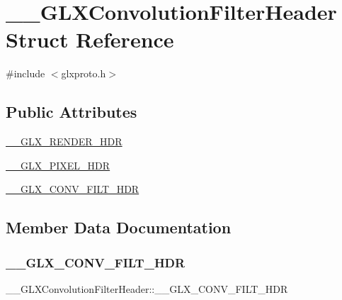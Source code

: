 \hypertarget{struct_____g_l_x_convolution_filter_header}{}\section{\+\_\+\+\_\+\+G\+L\+X\+Convolution\+Filter\+Header Struct Reference}
\label{struct_____g_l_x_convolution_filter_header}


{\ttfamily \#include $<$glxproto.\+h$>$}

\subsection*{Public Attributes}
\begin{DoxyCompactItemize}
\item 
\hyperlink{struct_____g_l_x_convolution_filter_header_afaa7f93d50e1289ca7720fdeb2a12aa8}{\+\_\+\+\_\+\+G\+L\+X\+\_\+\+R\+E\+N\+D\+E\+R\+\_\+\+H\+DR}
\item 
\hyperlink{struct_____g_l_x_convolution_filter_header_a9c9149168aaa3dfc3dbf8a5217cdf3ee}{\+\_\+\+\_\+\+G\+L\+X\+\_\+\+P\+I\+X\+E\+L\+\_\+\+H\+DR}
\item 
\hyperlink{struct_____g_l_x_convolution_filter_header_afc29b27ef6f497ab54dd1b1a785deac2}{\+\_\+\+\_\+\+G\+L\+X\+\_\+\+C\+O\+N\+V\+\_\+\+F\+I\+L\+T\+\_\+\+H\+DR}
\end{DoxyCompactItemize}


\subsection{Member Data Documentation}
\mbox{\label{struct_____g_l_x_convolution_filter_header_afc29b27ef6f497ab54dd1b1a785deac2}} 
\subsubsection{\texorpdfstring{\+\_\+\+\_\+\+G\+L\+X\+\_\+\+C\+O\+N\+V\+\_\+\+F\+I\+L\+T\+\_\+\+H\+DR}{\_\_GLX\_CONV\_FILT\_HDR}}
{\footnotesize\ttfamily \+\_\+\+\_\+\+G\+L\+X\+Convolution\+Filter\+Header\+::\+\_\+\+\_\+\+G\+L\+X\+\_\+\+C\+O\+N\+V\+\_\+\+F\+I\+L\+T\+\_\+\+H\+DR}

